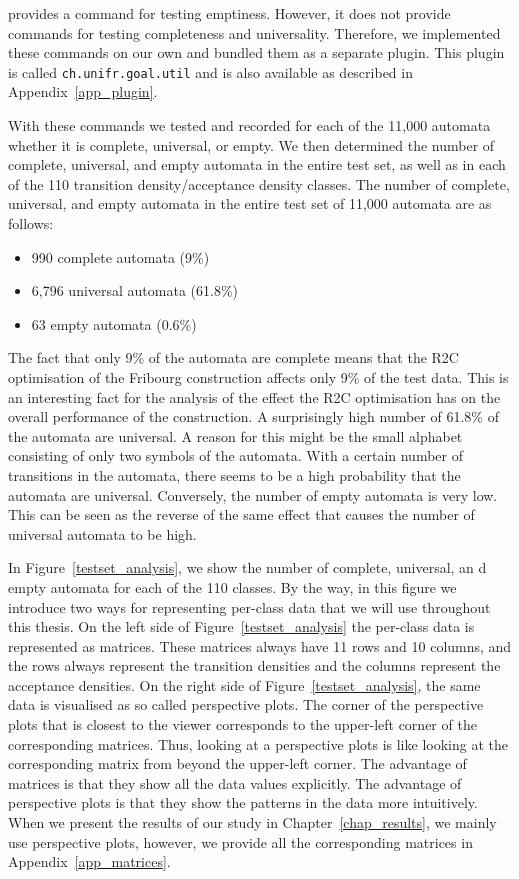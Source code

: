 \goal{} provides a command for testing emptiness. However, it does not provide commands for testing completeness and universality. Therefore, we implemented these commands on our own and bundled them as a separate \goal{} plugin. This plugin is called \texttt{ch.unifr.goal.util} and is also available as described in Appendix~\ref{app_plugin}.

With these \goal{} commands we tested and recorded for each of the 11,000 automata whether it is complete, universal, or empty. We then determined the number of complete, universal, and empty automata in the entire test set, as well as in each of the 110 transition density/acceptance density classes. The number of complete, universal, and empty automata in the entire test set of 11,000 automata are as follows:

\begin{itemize}
\item 990 complete automata (9\%)
\item 6,796 universal automata (61.8\%)
\item 63 empty automata (0.6\%)
\end{itemize}

The fact that only 9\% of the automata are complete means that the R2C optimisation of the Fribourg construction affects only 9\% of the test data. This is an interesting fact for the analysis of the effect the R2C optimisation has on the overall performance of the construction. A surprisingly high number of 61.8\% of the automata are universal. A reason for this might be the small alphabet consisting of only two symbols of the automata. With a certain number of transitions in the automata, there seems to be a high probability that the automata are universal. Conversely, the number of empty automata is very low. This can be seen as the reverse of the same effect that causes the number of universal automata to be high.

In Figure~\ref{testset_analysis}, we show the number of complete, universal, an d empty automata for each of the 110 classes. By the way, in this figure we introduce two ways for representing per-class data that we will use throughout this thesis. On the left side of Figure~\ref{testset_analysis} the per-class data is represented as matrices. These matrices always have 11 rows and 10 columns, and the rows always represent the transition densities and the columns represent the acceptance densities. On the right side of Figure~\ref{testset_analysis}, the same data is visualised as so called perspective plots. The corner of the perspective plots that is closest to the viewer corresponds to the upper-left corner of the corresponding matrices. Thus, looking at a perspective plots is like looking at the corresponding matrix from beyond the upper-left corner. The advantage of matrices is that they show all the data values explicitly. The advantage of perspective plots is that they show the patterns in the data more intuitively. When we present the results of our study in Chapter~\ref{chap_results}, we mainly use perspective plots, however, we provide all the corresponding matrices in Appendix~\ref{app_matrices}.

